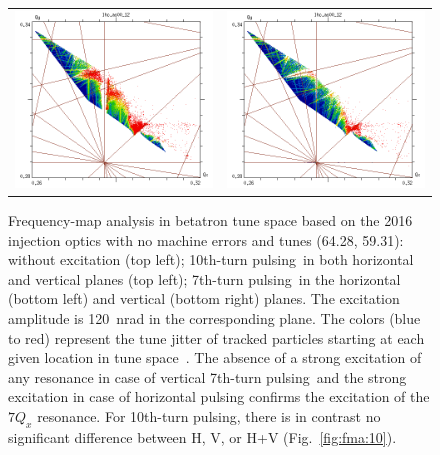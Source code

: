 \documentclass[
prstab
,reprint
,linenumbers
,longbibliography
,preprintnumbers
,showkeys
,amsfonts,amssymb,amsmath
,floatfix
]{revtex4-1}
\newcommand{\seventhtp}{7th-turn pulsing}
\newcommand{\tenthtp}{10th-turn pulsing}
\newlength{\fmawidth}
\begin{document}
\begin{figure}
\begin{tabular}{cc}
    \includegraphics[width=\fmawidth]{2016injnocolc15o+19_6noerrut7skh_dp0_ord7.png} &
    \includegraphics[width=\fmawidth]{2016injnocolc15o+19_6noerrut7skv_dp0_ord7.png} \\
  \end{tabular}
  \caption{Frequency-map analysis in betatron tune space based on the
    2016 injection optics with no machine errors and tunes (64.28,
    59.31): without excitation (top left); \tenthtp\ in both
    horizontal and vertical planes (top left); \seventhtp\ in the
    horizontal (bottom left) and vertical (bottom right) planes. The
    excitation amplitude is 120~nrad in the corresponding plane. The
    colors (blue to red) represent the tune jitter of tracked
    particles starting at each given location in tune
    space~\cite{fmalaskar}. The absence of a strong excitation of any
    resonance in case of vertical \seventhtp\ and the strong
    excitation in case of horizontal pulsing confirms the excitation
    of the $7 Q_x$ resonance. For \tenthtp, there is in contrast no
    significant difference between H, V, or H+V
    (Fig.~\ref{fig:fma:10}).}
  \label{fig:patternfma}
\end{figure}
\end{document}
